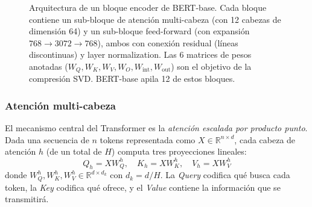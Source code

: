\begin{figure}[H]
    \shorthandon{><}
    \caption{Arquitectura de un bloque encoder de BERT-base. Cada bloque contiene
    un sub-bloque de atención multi-cabeza (con 12 cabezas de dimensión 64) y un
    sub-bloque feed-forward (con expansión $768 \rightarrow 3072 \rightarrow 768$),
    ambos con conexión residual (líneas discontinuas) y layer normalization. Las 6
    matrices de pesos anotadas ($W_Q, W_K, W_V, W_O, W_{\text{int}}, W_{\text{out}}$)
    son el objetivo de la compresión SVD. BERT-base apila 12 de estos bloques.}
    \label{fig:bert-encoder}
\end{figure}

\subsubsection{Atención multi-cabeza}
\label{sec:sota-mha}

El mecanismo central del Transformer es la \emph{atención escalada por producto
punto}. Dada una secuencia de $n$ tokens representada como $X \in \mathbb{R}^{n
\times d}$, cada cabeza de atención $h$ (de un total de $H$) computa tres
proyecciones lineales:
\begin{equation}
    Q_h = X W_Q^h, \quad K_h = X W_K^h, \quad V_h = X W_V^h
    \label{eq:qkv}
\end{equation}
donde $W_Q^h, W_K^h, W_V^h \in \mathbb{R}^{d \times d_k}$ con $d_k = d/H$. La
\emph{Query} codifica qué busca cada token, la \emph{Key} codifica qué ofrece, y
el \emph{Value} contiene la información que se transmitirá.

